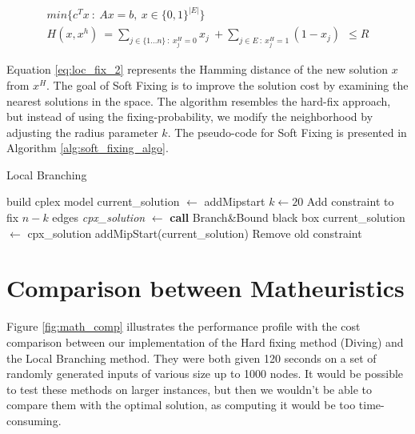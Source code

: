 \begin{align}
    min\{c^Tx\ : \ Ax=b,\ x \in \{0,1\}^{|E|}\} \label{eq:loc_fix_2} \\[2em]
    H(x,x^h)\ = \sum_{j \in \{1 ... n\}\ :\ x_{j}^{H}=0} x_j\ + \sum_{j \in E\ :\ x_{j}^{H}=1} (1 - x_j)\ \ \leq R \label{eq:loc_fix_2}
\end{align}

Equation \ref{eq:loc_fix_2} represents the Hamming distance of the new solution \(x\) from \(x^H\). The goal of Soft Fixing is to improve the solution cost by examining the nearest solutions in the space. The algorithm resembles the hard-fix approach, but instead of using the fixing-probability, we modify the neighborhood by adjusting the radius parameter \(k\). The pseudo-code for Soft Fixing is presented in Algorithm \ref{alg:soft_fixing_algo}.\\

\begin{algorithm}[H]
    \caption{Local Branching}
    \label{alg:soft_fixing_algo}
    \begin{spacing}{1.2} %
        \BlankLine
        build cplex model\;
        current\_solution $\leftarrow$ addMipstart\;
        $k \leftarrow 20$\;
        \BlankLine
        {
            Add constraint to fix $n-k$ edges\;
            \BlankLine
            \textit{cpx\_solution} $\leftarrow$ \textbf{call} Branch\&Bound black box\;
            \BlankLine
            {
                current\_solution $\leftarrow$ cpx\_solution\;
                addMipStart(current\_solution)\;
            }
            \BlankLine
            Remove old constraint\;
        }
    \end{spacing}
\end{algorithm}

\newpage

\section{Comparison between Matheuristics}
Figure \ref{fig:math_comp} illustrates the performance profile with the cost comparison between our implementation of the Hard fixing method (Diving) and the Local Branching method. 
They were both given 120 seconds on a set of randomly generated inputs of various size up to 1000 nodes. It would be possible to test these methods on larger instances, but then we wouldn't be able to compare them with the optimal solution, as computing it would be too time-consuming.

